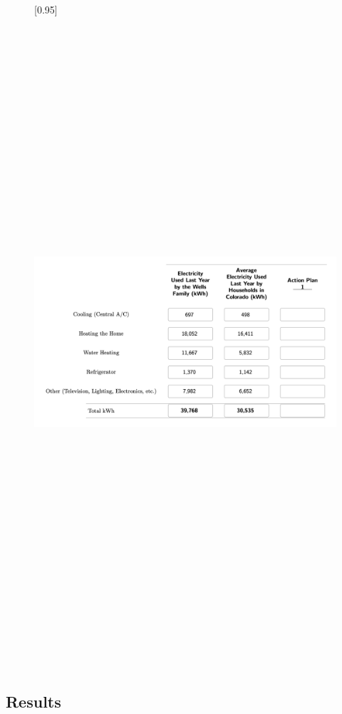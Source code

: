 \documentclass[
  12pt,
]{article}
\begin{document}
\begin{multicols}{3}
\begin{figure}[H]
{\begin{minipage}[t]{0.68\linewidth}
    \centering
    [0.95\linewidth]{%
      \includegraphics[width=\linewidth,height=9.5in, keepaspectratio]{assets/images/tab.png}
    }
  \end{minipage}
}

\end{figure}

\columnbreak

\subsection{Results}\label{results}


\end{multicols}
\end{document}
